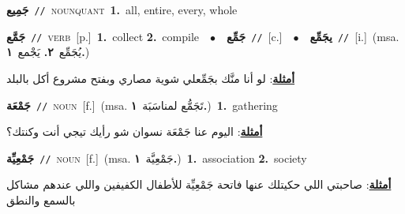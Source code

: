 \documentclass[10pt,a4paper,twoside]{article} %
\begin{document}
\begin{multicols}{2}
{\setlength\topsep{0pt}\textbf{\foreignlanguage{arabic}{جَمِيع}}\ {\color{gray}\texttt{//}\color{black}}\ \textsc{noun\textunderscore quant}\ \textbf{1.}~all, entire, every, whole\ } \vspace{2mm}

{\setlength\topsep{0pt}\textbf{\foreignlanguage{arabic}{جَمَّع}}\ {\color{gray}\texttt{//}\color{black}}\ \textsc{verb}\ [p.]\ \textbf{1.}~collect  \textbf{2.}~compile\ \ $\bullet$\ \ \setlength\topsep{0pt}\textbf{\foreignlanguage{arabic}{جَمِّع}}\ {\color{gray}\texttt{//}\color{black}}\ [c.]\ \ $\bullet$\ \ \setlength\topsep{0pt}\textbf{\foreignlanguage{arabic}{يجَمِّع}}\ {\color{gray}\texttt{//}\color{black}}\ [i.]\ \color{gray}(msa. \foreignlanguage{arabic}{يُجَمِّع}~\foreignlanguage{arabic}{\textbf{٢.}}  \foreignlanguage{arabic}{يَجْمع}~\foreignlanguage{arabic}{\textbf{١.}})\color{black}\  \begin{flushright}\color{gray}\foreignlanguage{arabic}{\textbf{\underline{\foreignlanguage{arabic}{أمثلة}}}: لو أنا منَّك بجَمِّعلي شوية مصاري وبفتح مشروع أكل بالبلد}\end{flushright}\color{black}} \vspace{2mm}

{\setlength\topsep{0pt}\textbf{\foreignlanguage{arabic}{جَمْعَة}}\ {\color{gray}\texttt{//}\color{black}}\ \textsc{noun}\ [f.]\ \color{gray}(msa. \foreignlanguage{arabic}{تَجَمُّع لمناسَبَة}~\foreignlanguage{arabic}{\textbf{١.}})\color{black}\ \textbf{1.}~gathering\  \begin{flushright}\color{gray}\foreignlanguage{arabic}{\textbf{\underline{\foreignlanguage{arabic}{أمثلة}}}: اليوم عنا جَمْعَة نسوان شو رأيك تيجي أنت وكنتك؟}\end{flushright}\color{black}} \vspace{2mm}

{\setlength\topsep{0pt}\textbf{\foreignlanguage{arabic}{جَمْعِيِّة}}\ {\color{gray}\texttt{//}\color{black}}\ \textsc{noun}\ [f.]\ \color{gray}(msa. \foreignlanguage{arabic}{جَمْعِيَّة}~\foreignlanguage{arabic}{\textbf{١.}})\color{black}\ \textbf{1.}~association  \textbf{2.}~society\  \begin{flushright}\color{gray}\foreignlanguage{arabic}{\textbf{\underline{\foreignlanguage{arabic}{أمثلة}}}: صاحبتي اللي حكيتلك عنها فاتحة جَمْعِيِّة للأطفال الكفيفين واللي عندهم مشاكل بالسمع والنطق}\end{flushright}\color{black}} \vspace{2mm}


\end{multicols}
\end{document}
